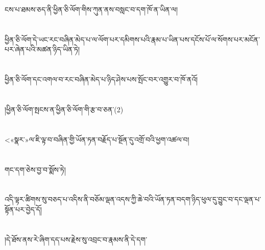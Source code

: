 ངས་པ་ཐམས་ཅད་ནི་ཕྱིན་ཅི་ལོག་གིས་ཀུན་ནས་བསླང་བ་དག་ཁོ་ན་ཡིན་ལ།\chapter{ }ཕྱིན་ཅི་ལོག་དེ་ཡང་རང་བཞིན་མེད་པ་ལ་ལོག་པར་དམིགས་པའི་རྣམ་པ་ཡིན་པས་དངོས་པོ་ལ་སོགས་པར་མངོན་པར་ཞེན་པའི་མཚན་ཉིད་ཡིན་ཏེ།\chapter{ }ཕྱིན་ཅི་ལོག་དང་འགལ་བ་རང་བཞིན་མེད་པ་ཉིད་ཤེས་པས་སྤོང་བར་འགྱུར་བ་ཁོ་ནའོ།\chapter{ }།ཕྱིན་ཅི་ལོག་སྤངས་ན་ཕྱིན་ཅི་ལོག་གི་རྩ་བ་ཅན་(2)\chapter{ }<«སྣར་»ལ་ཇི་ལྟ་བ་བཞིན་གྱི་ཡོན་ཏན་བརྗོད་པ་སྔོན་དུ་འགྲོ་བའི་ཕྱག་འཚལ་བ།\chapter{ }གང་དག་ཅེས་བྱ་བ་སྨོས་ཏེ།\chapter{ }འདི་ལྟར་ཚིགས་སུ་བཅད་པ་འདིས་ནི་བཅོམ་ལྡན་འདས་ཀྱི་ཆེ་བའི་ཡོན་ཏན་བདག་ཉིད་ཕུལ་དུ་བྱུང་བ་དང་ལྡན་པ་སྟོན་པར་བྱེད་དོ།\chapter{ }།དེ་ཐོས་ནས་རེ་ཞིག་དད་པས་རྗེས་སུ་འབྲང་བ་རྣམས་ནི་དེ་དག་
